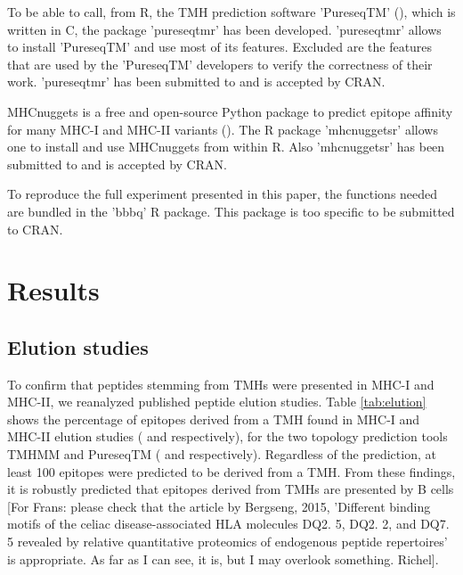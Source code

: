 To be able to call, from R, the TMH prediction 
software 'PureseqTM' (\cite{wang2019efficient}),
which is written in C, the package 'pureseqtmr' has been developed. 
'pureseqtmr' allows to install 'PureseqTM' and use most of its features.
Excluded are the features that are used by the 'PureseqTM' 
developers to verify the correctness of their work.
'pureseqtmr' has been submitted to and is accepted by CRAN.


MHCnuggets is a free and open-source Python package to predict 
epitope affinity for many MHC-I and MHC-II variants (\cite{shao2020high}).
The R package 'mhcnuggetsr' allows one to install and use MHCnuggets
from within R.
Also 'mhcnuggetsr' has been submitted to and is accepted by CRAN.


To reproduce the full experiment presented in this paper,
the functions needed are bundled in the 'bbbq' R package.
This package is too specific to be submitted to CRAN.

\section{Results}

\subsection{Elution studies}



To confirm that peptides stemming from TMHs were presented in MHC-I and MHC-II,
we reanalyzed published peptide elution studies.
Table \ref{tab:elution} shows the percentage of epitopes derived 
from a TMH
found in MHC-I and MHC-II elution 
studies (\cite{schellens2015comprehensive} and \cite{bergseng2015different} respectively),
for the two topology prediction tools TMHMM and 
PureseqTM (\cite{krogh2001predicting} and \cite{wang2019efficient} respectively). 
Regardless of the prediction, 
at least 100 epitopes were predicted to be derived from a TMH. 
From these findings, it is robustly predicted that
epitopes derived from TMHs are presented by B cells [For Frans: please check
that the article by Bergseng, 2015, 'Different binding motifs of the celiac 
disease-associated HLA molecules DQ2. 5, DQ2. 2, and DQ7. 5 revealed by 
relative quantitative proteomics of endogenous peptide repertoires'
is appropriate. As far as I can see, it is, but I may overlook something. Richel].


